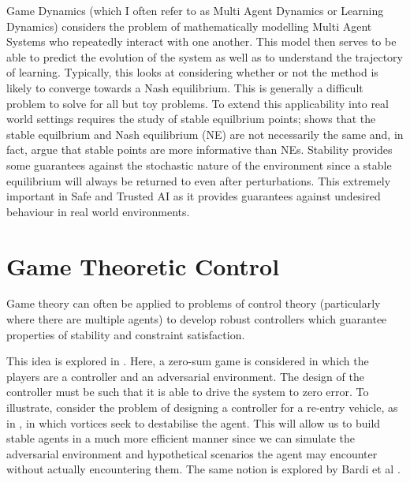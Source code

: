 \documentclass[../sample.tex]{subfiles}
\begin{document}
Game Dynamics (which I often refer to as Multi Agent Dynamics or Learning Dynamics) considers the
problem of mathematically modelling Multi Agent Systems who repeatedly interact with one another.
This model then serves to be able to predict the evolution of the system as well as to understand
the trajectory of learning. Typically, this looks at considering whether or not the method is likely
to converge towards a Nash equilibrium. This is generally a difficult problem to solve
\cite{ShohamMultiagentFoundations} for all but toy problems. To extend this applicability into real
world settings requires the study of stable equilbrium points;
\cite{Letcher2019DifferentiableMechanics} shows that the stable equilbrium and Nash equilibrium (NE)
are not necessarily the same and, in fact, argue that stable points are more informative than NEs.
Stability provides some guarantees against the stochastic nature of the environment since a stable
equilibrium will always be returned to even after perturbations. This extremely important in Safe
and Trusted AI as it provides guarantees against undesired behaviour in real world environments.


\section{Game Theoretic Control}

Game theory can often be applied to problems of control theory (particularly where there are
multiple agents) to develop robust controllers which guarantee properties of stability and
constraint satisfaction. 

This idea is explored in \cite{Marden2018AnnualControl}. Here, a zero-sum game is considered in
which the players are a controller and an adversarial environment. The design of the controller must
be such that it is able to drive the system to zero error. To illustrate, consider the problem of
designing a controller for a re-entry vehicle, as in \cite{Breitner1994ReentryGame}, in which
vortices seek to destabilise the agent. This will allow us to build stable agents in a much more
efficient manner since we can simulate the adversarial environment and hypothetical scenarios the
agent may encounter without actually encountering them. The same notion is explored by Bardi et al
\cite{Bardi1991DifferentialDisturbances}.
\end{document}
